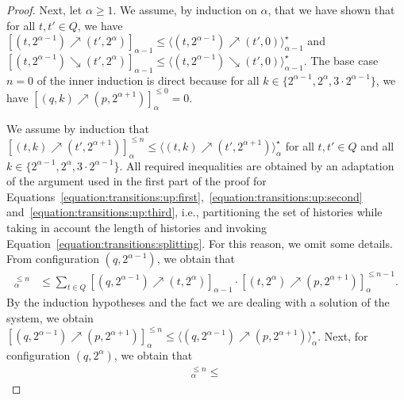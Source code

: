 \documentclass[a4paper,UKenglish,cleveref,autoref,thm-restate,colorlinks]{lipics-v2021}
\newcommand{\indexLast}{n}
\newcommand{\ocStateSpace}{Q}
\newcommand{\ocState}{q}
\newcommand{\ocStateB}{p}
\newcommand{\ocStateC}{t}
\newcommand{\ocStateD}{t'}
\newcommand{\ocCount}{k}
\newcommand{\powerIndex}{\alpha}
\newcommand{\upProba}[5]{[(#1,#2)\nearrow{}(#3,#4)]_{#5}}
\newcommand{\downProba}[5]{[(#1,#2)\searrow{}(#3,#4)]_{#5}}
\newcommand{\upProbaVar}[5]{\langle (#1,#2)\nearrow{}(#3,#4)\rangle_{#5}}
\newcommand{\downProbaVar}[5]{\langle (#1,#2)\searrow{}(#3,#4)\rangle_{#5}}
\begin{document}
\begin{proof}
  Next, let $\powerIndex\geq 1$.
  We assume, by induction on $\powerIndex$, that we have shown that for all $\ocStateC, \ocStateD\in\ocStateSpace$, we have $\upProba{\ocStateC}{2^{\powerIndex-1}}{\ocStateD}{2^{\powerIndex}}{\powerIndex-1}\leq \upProbaVar{\ocStateC}{2^{\powerIndex-1}}{\ocStateD}{0}{\powerIndex-1}^\star$ and $\downProba{\ocStateC}{2^{\powerIndex-1}}{\ocStateD}{2^{\powerIndex}}{\powerIndex-1}\leq \downProbaVar{\ocStateC}{2^{\powerIndex-1}}{\ocStateD}{0}{\powerIndex-1}^\star$.
  The base case $\indexLast = 0$ of the inner induction is direct because for all $\ocCount\in\{2^{\powerIndex-1}, 2^{\powerIndex}, 3\cdot 2^{\powerIndex-1}\}$, we have $\upProba{\ocState}{\ocCount}{\ocStateB}{2^{\powerIndex+1}}{\powerIndex}^{\leq 0}=0$.

  We assume by induction that $\upProba{\ocStateC}{\ocCount}{\ocStateD}{2^{\powerIndex+1}}{\powerIndex}^{\leq\indexLast}\leq\upProbaVar{\ocStateC}{\ocCount}{\ocStateD}{2^{\powerIndex+1}}{\powerIndex}^\star$ for all $\ocStateC, \ocStateD\in\ocStateSpace$ and all $\ocCount\in \{2^{\powerIndex-1}, 2^{\powerIndex}, 3\cdot 2^{\powerIndex-1}\}$.
  All required inequalities are obtained by an adaptation of the argument used in the first part of the proof for Equations~\eqref{equation:transitions:up:first},~\eqref{equation:transitions:up:second} and~\eqref{equation:transitions:up:third}, i.e., partitioning the set of histories while taking in account the length of histories and invoking Equation~\eqref{equation:transitions:splitting}.
  For this reason, we omit some details.
  From configuration $(\ocState, 2^{\powerIndex-1})$, we obtain that
  \begin{align*}
    \upProba{\ocState}{2^{\powerIndex-1}}{\ocStateB}{2^{\powerIndex+1}}{\powerIndex}^{\leq\indexLast} & \leq\sum_{\ocStateC\in\ocStateSpace}
    \upProba{\ocState}{2^{\powerIndex-1}}{\ocStateC}{2^{\powerIndex}}{\powerIndex-1}
    \cdot
    \upProba{\ocStateC}{2^{\powerIndex}}{\ocStateB}{2^{\powerIndex+1}}{\powerIndex}^{\leq\indexLast-1}.
  \end{align*}
  By the induction hypotheses and the fact we are dealing with a solution of the system, we obtain $\upProba{\ocState}{2^{\powerIndex-1}}{\ocStateB}{2^{\powerIndex+1}}{\powerIndex}^{\leq\indexLast} \leq \upProbaVar{\ocState}{2^{\powerIndex-1}}{\ocStateB}{2^{\powerIndex+1}}{\powerIndex}^\star$.
  Next, for configuration $(\ocState, 2^\powerIndex)$, we obtain that 
  \begin{align*}
    \upProba{\ocState}{2^{\powerIndex}}{\ocStateB}{2^{\powerIndex+1}}{\powerIndex}^{\leq\indexLast} \leq

\end{align*}
\end{proof}
\end{document}
